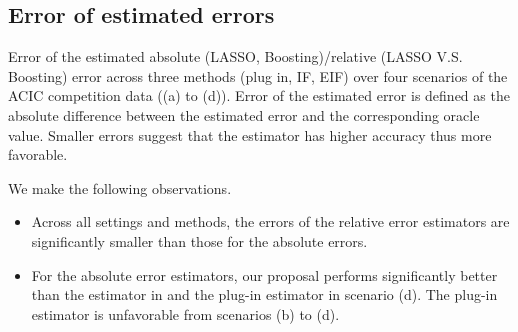 \subsection{Error of estimated errors}\label{appe:sec:simulation.estimation.error}

Error of the estimated absolute (LASSO, Boosting)/relative (LASSO V.S. Boosting) error across three methods (plug in, IF, EIF) over four scenarios of the ACIC competition data ((a) to (d)). 
Error of the estimated error is defined as the absolute difference between the estimated error and the corresponding oracle value.
Smaller errors suggest that the estimator has higher accuracy thus more favorable.


We make the following observations.
\begin{itemize}
    \item Across all settings and methods, the errors of the relative error estimators are significantly smaller than those for the absolute errors.
    \item For the absolute error estimators, our proposal performs significantly better than the estimator in \cite{alaa2019validating} and the plug-in estimator in scenario (d). The plug-in estimator is unfavorable from scenarios (b) to (d).
\end{itemize}


